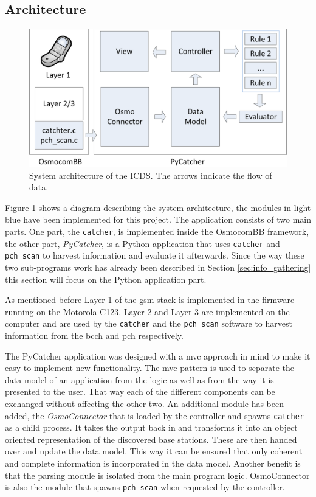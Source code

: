 \subsection{Architecture}
\begin{figure}
\centering
\includegraphics{../Images/Architecture_software}
\caption{System architecture of the ICDS. The arrows indicate the flow of data.}
\label{fig:architecture}
\end{figure}
Figure \ref{fig:architecture} shows a diagram describing the system architecture, the modules in light blue have been implemented for this project.
The application consists of two main parts.
One part, the \texttt{catcher}, is implemented inside the OsmocomBB framework, the other part, \emph{PyCatcher}, is a Python application that uses \texttt{catcher} and \texttt{pch\_scan} to harvest information and evaluate it afterwards.
Since the way these two sub-programs work has already been described in Section \ref{sec:info_gathering} this section will focus on the Python application part.

As mentioned before Layer 1 of the \gls{gsm} stack is implemented in the firmware running on the Motorola C123.
Layer 2 and Layer 3 are implemented on the computer and are used by the \texttt{catcher} and the \texttt{pch\_scan} software to harvest information from the \gls{bcch} and \gls{pch} respectively.

The PyCatcher application was designed with a \gls{mvc} approach in mind to make it easy to implement new functionality.
The \gls{mvc} pattern is used to separate the data model of an application from the logic as well as from the way it is presented to the user.
That way each of the different components can be exchanged without affecting the other two.
An additional module has been added, the \emph{OsmoConnector} that is loaded by the controller and spawns \texttt{catcher} as a child process.
It takes the output back in and transforms it into an object oriented representation of the discovered base stations.
These are then handed over and update the data model.
This way it can be ensured that only coherent and complete information is incorporated in the data model.
Another benefit is that the parsing module is isolated from the main program logic.
OsmoConnector is also the module that spawns \texttt{pch\_scan} when requested by the controller.


